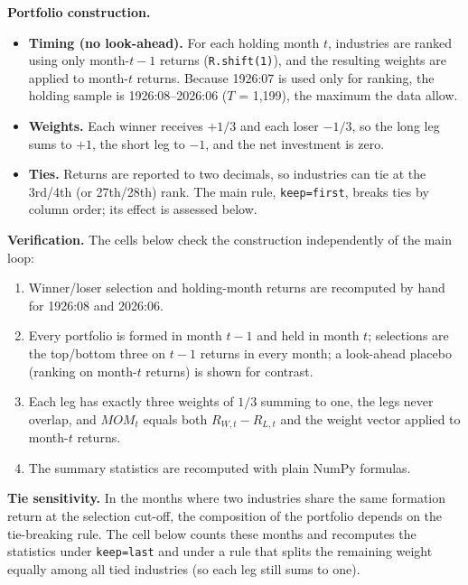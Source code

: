 \documentclass[11pt]{article}
\begin{document}
\textbf{Portfolio construction.}
\begin{itemize}
  \item \textbf{Timing (no look-ahead).} For each holding month $t$, industries are ranked using only month-$t-1$ returns (\texttt{R.shift(1)}), and the resulting weights are applied to month-$t$ returns. Because 1926:07 is used only for ranking, the holding sample is 1926:08–2026:06 ($T$ = 1,199), the maximum the data allow.
  \item \textbf{Weights.} Each winner receives $+1/3$ and each loser $-1/3$, so the long leg sums to $+1$, the short leg to $-1$, and the net investment is zero.
  \item \textbf{Ties.} Returns are reported to two decimals, so industries can tie at the 3rd/4th (or 27th/28th) rank. The main rule, \texttt{keep=\textquotedbl{}first\textquotedbl{}}, breaks ties by column order; its effect is assessed below.
\end{itemize}
 
\textbf{Verification.} The cells below check the construction independently of the main loop:
\begin{enumerate}
  \item Winner/loser selection and holding-month returns are recomputed by hand for 1926:08 and 2026:06.
  \item Every portfolio is formed in month $t-1$ and held in month $t$; selections are the top/bottom three on $t-1$ returns in every month; a look-ahead placebo (ranking on month-$t$ returns) is shown for contrast.
  \item Each leg has exactly three weights of $1/3$ summing to one, the legs never overlap, and $MOM_t$ equals both $R_{W,t}-R_{L,t}$ and the weight vector applied to month-$t$ returns.
  \item The summary statistics are recomputed with plain NumPy formulas.
\end{enumerate}
 
\textbf{Tie sensitivity.} In the months where two industries share the same formation return at the selection cut-off, the composition of the portfolio depends on the tie-breaking rule. The cell below counts these months and recomputes the statistics under \texttt{keep=\textquotedbl{}last\textquotedbl{}} and under a rule that splits the remaining weight equally among all tied industries (so each leg still sums to one).
 
\end{document}
